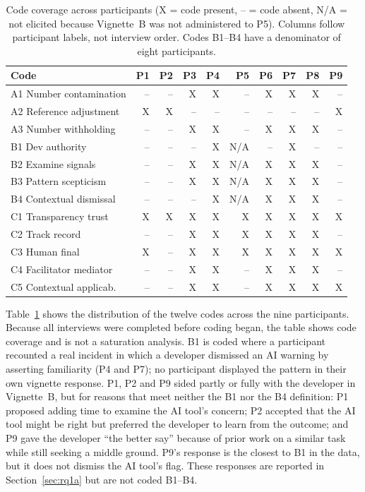 \documentclass[a4paper,twoside]{bth}
\begin{document}
\begin{table}[htb]
\caption{Code coverage across participants (X = code present, -- = code absent, N/A = not elicited because Vignette~B was not administered to P5). Columns follow participant labels, not interview order. Codes B1--B4 have a denominator of eight participants.}
\label{tab:saturation}
\centering
\small
\begin{tabular}{lrrrrrrrrr}
\toprule
Code & P1 & P2 & P3 & P4 & P5 & P6 & P7 & P8 & P9 \\
\midrule
A1 Number contamination & -- & -- & X & X & -- & X & X & X & -- \\
A2 Reference adjustment & X & X & -- & -- & -- & -- & -- & -- & X \\
A3 Number withholding   & -- & -- & X & X & -- & X & X & X & -- \\
B1 Dev authority        & -- & -- & -- & X & N/A & -- & X & -- & -- \\
B2 Examine signals      & -- & -- & X & X & N/A & X & X & X & -- \\
B3 Pattern scepticism   & -- & -- & X & X & N/A & X & X & X & -- \\
B4 Contextual dismissal & -- & -- & -- & X & N/A & X & X & X & -- \\
C1 Transparency trust   & X & X & X & X & X & X & X & X & X \\
C2 Track record         & -- & -- & X & X & X & X & X & X & -- \\
C3 Human final          & X & -- & X & X & X & X & X & X & X \\
C4 Facilitator mediator & -- & -- & X & X & -- & X & X & X & -- \\
C5 Contextual applicab. & -- & -- & X & X & -- & X & X & X & X \\
\bottomrule
\end{tabular}
\end{table}

Table~\ref{tab:saturation} shows the distribution of the twelve codes across the nine participants. Because all interviews were completed before coding began, the table shows code coverage and is not a saturation analysis. B1 is coded where a participant recounted a real incident in which a developer dismissed an AI warning by asserting familiarity (P4 and P7); no participant displayed the pattern in their own vignette response. P1, P2 and P9 sided partly or fully with the developer in Vignette~B, but for reasons that meet neither the B1 nor the B4 definition: P1 proposed adding time to examine the AI tool's concern; P2 accepted that the AI tool might be right but preferred the developer to learn from the outcome; and P9 gave the developer ``the better say'' because of prior work on a similar task while still seeking a middle ground. P9's response is the closest to B1 in the data, but it does not dismiss the AI tool's flag. These responses are reported in Section~\ref{sec:rq1a} but are not coded B1--B4.
\end{document}

